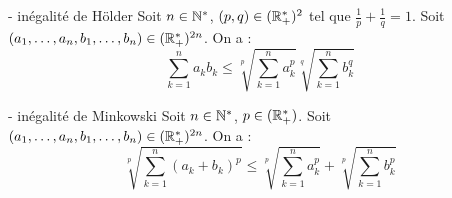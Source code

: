 

    \begin{theoreme}{19.26}{ - inégalité de Hölder}
        Soit $n \in \mathbb{N}^*$, $(p,q) \in (\mathbb{R}_+^*)^2$ tel que $\displaystyle \frac{1}{p} + \frac{1}{q} = 1$. Soit $(a_1,\dots,a_n,b_1,\dots,b_n) \in (\mathbb{R}_+^*)^{2n}$. On a : $$\sum_{k=1}^{n}a_kb_k \leq \sqrt[p]{\sum_{k=1}^{n}a_k^p} \sqrt[q]{\sum_{k=1}^{n}b_k^q}$$ 
    \end{theoreme}

    \begin{theoreme}{19.27}{ - inégalité de Minkowski}
        Soit $n \in \mathbb{N}^*$, $p \in (\mathbb{R}_+^*)$. Soit $(a_1,\dots,a_n,b_1,\dots,b_n) \in (\mathbb{R}_+^*)^{2n}$. On a : $$\sqrt[p]{\sum_{k=1}^{n}(a_k + b_k)^p} \leq \sqrt[p]{\sum_{k=1}^{n}a_k^p} + \sqrt[p]{\sum_{k=1}^{n}b_k^p} $$ 
    \end{theoreme}
